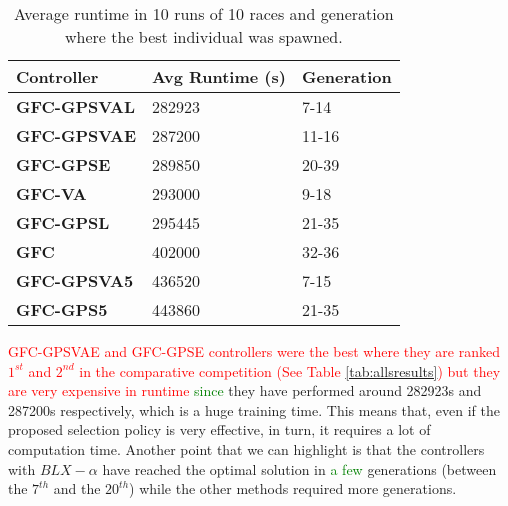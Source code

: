 \documentclass[10pt,journal,compsoc]{IEEEtran}
\begin{document}
\begin{table}[!ht]
	\centering
	{\scriptsize
          \caption{Average runtime in 10 runs of 10 races 
            and
                  generation where the best individual was spawned.}
		\label{tab:time}
		\begin{tabular}{|p{2.85cm}|p{2.20cm}|p{1.65cm}|}
			\hline  
			Controller& \textbf{Avg Runtime (s)}&\textbf{Generation}\\
\hline
\hline 	 
 \textbf{{\sf GFC-GPSVAL}} \cite{DBLP:conf/cig/SalemMG19}&282923
&7-14\\	
\textbf{{\sf GFC-GPSVAE}}&287200
&11-16\\
 \textbf{{\sf GFC-GPSE}}&289850
&20-39\\
\textbf{{\sf GFC-VA}} \cite{DBLP:conf/cig/SalemMG19}&293000
&9-18\\
 \textbf{{\sf GFC-GPSL}} \cite{DBLP:conf/cig/SalemMG19}&295445
&21-35\\
\textbf{\textbf{{\sf GFC}}} \cite{salem_cig2018}&402000
                   &32-36\\
\textbf{{\sf GFC-GPSVA5}} \cite{DBLP:conf/cig/SalemMG19}&436520
&7-15\\		
 \textbf{{\sf GFC-GPS5}} \cite{DBLP:conf/cig/SalemMG19}&443860
				&21-35\\	
					
			\hline 
		
		\end{tabular}
		
	}
\end{table} 
\textcolor{red}{{\sf GFC-GPSVAE} and {\sf GFC-GPSE} controllers were the best where
they are ranked $1^{st}$ and $2^{nd}$ in the comparative competition (See Table \ref{tab:allsresults}) but they are very expensive in runtime }\textcolor{green}{ since} they have performed around 282923s and 287200s respectively, which is a
huge training time. %
This means that, even if the proposed selection policy is very effective, in turn, it requires a lot of computation time.
%
Another point that we can highlight is that the controllers with
$BLX-\alpha$ have reached the optimal solution in \textcolor{green}{ a few}  generations
(between the $7^{th}$ and the $20^{th}$) while the other methods required more
generations. 
\end{document}
